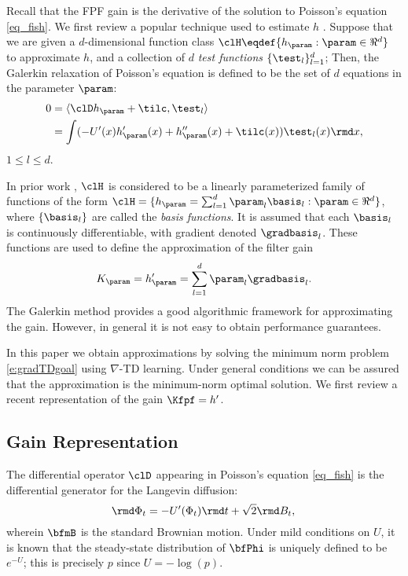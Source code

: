 Recall that the FPF gain is the derivative of the solution to Poisson's equation \eqref{eq_fish}.
We first review a popular technique used to estimate $h$ \cite{yanmehmey13,yanlaumehmey16}.
Suppose that we are given a $d$-dimensional  function class
$\clH  \eqdef \{h_{\param} : \param \in \Re^d\}$ to approximate $h$, and a collection of $d$ \textit{test functions} $\{\test_{l}\}_{l=1}^{d}$; Then, the Galerkin relaxation of Poisson's equation is defined to be the set of $d$ equations in the parameter $\param$:
\begin{equation}
\begin{aligned}
0 &= \langle \clD h_{\param}+\tilc, \test_{l} \rangle \\
&= \int (-U'(x) h_{\param}'(x)+ h_{\param}''(x)+\tilc (x))\test_{l}(x) \rmd x,
\end{aligned}
\label{eq_weak_formulation}
\end{equation}
$ 1\leq l \leq d$.


In prior work \cite{yanmehmey13,yanlaumehmey16}, $\clH$ is considered to be a linearly parameterized family of functions of the form $\clH =\{ h_{\param} = \sum_{l=1}^{d}\param_{l}\basis_{l} : \param\in\Re^d\}$, where $\{\basis_l\}$ are called the \textit{basis functions}. It is assumed that each $\basis_l$ is continuously differentiable,  with gradient denoted   $\gradbasis_{l} $. These   functions are used to define the approximation of the filter gain
\begin{equation}
K_\param = h_{\param}' = \sum_{l=1}^{d}\param_{l}\gradbasis_{l}.
\label{eq_basis_galerkin}
\end{equation}
The
Galerkin method provides a good algorithmic framework for approximating the gain. However, in general it is not easy to obtain performance guarantees.

In this paper we obtain approximations by solving  the minimum norm problem \eqref{e:gradTDgoal} using $\nabla$-TD learning.  Under general conditions we can be assured that the approximation is the minimum-norm optimal solution.   We first review a recent representation of the gain $\Kfpf = h'$.


\subsection{Gain Representation}

The differential operator $\clD $ appearing in Poisson's equation \eqref{eq_fish}
is the differential generator for the Langevin diffusion:
\begin{equation}
\rmd \Phi_t= - U'(\Phi_t) \rmd t + \sqrt{2} \rmd B_t,\\
\label{e:LE}
\end{equation}
wherein $\bfmB$ is the standard Brownian motion.   Under mild conditions on $U$, it is known that the steady-state distribution of $\bfPhi$ is uniquely defined to be $e^{-U}$;  this is precisely $p$ since $U=-\log(p)$.

